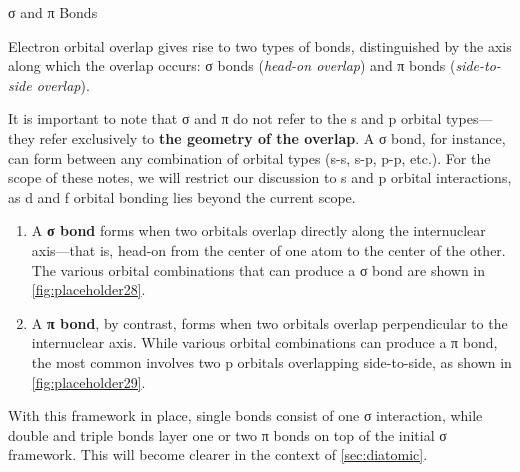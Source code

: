 \documentclass[10pt]{article}
\begin{document}
    \begin{core}{σ and π Bonds}

      Electron orbital overlap gives rise to two types of bonds, distinguished by the axis along which the overlap occurs: σ bonds (\textit{head-on overlap}) and π bonds (\textit{side-to-side overlap}).


      It is important to note that σ and π do not refer to the s and p orbital types---they refer exclusively to \textbf{the geometry of the overlap}. A σ bond, for instance, can form between any combination of orbital types (s-s, s-p, p-p, etc.). For the scope of these notes, we will restrict our discussion to s and p orbital interactions, as d and f orbital bonding lies beyond the current scope.

      \begin{enumerate}

        \item A \textbf{σ bond} forms when two orbitals overlap directly along the internuclear axis---that is, head-on from the center of one atom to the center of the other. The various orbital combinations that can produce a σ bond are shown in \autoref{fig:placeholder28}.


        \item A \textbf{π bond}, by contrast, forms when two orbitals overlap perpendicular to the internuclear axis. While various orbital combinations can produce a π bond, the most common involves two p orbitals overlapping side-to-side, as shown in \autoref{fig:placeholder29}.


      \end{enumerate}

      With this framework in place, single bonds consist of one σ interaction, while double and triple bonds layer one or two π bonds on top of the initial σ framework. This will become clearer in the context of \autoref{sec:diatomic}.

    \end{core}
 
\end{document}
